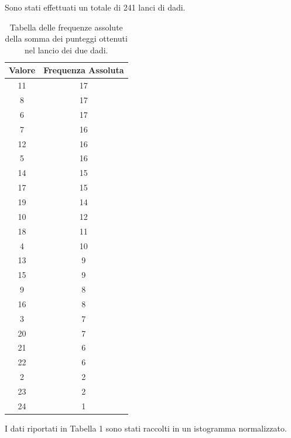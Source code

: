 Sono stati effettuati un totale di 241 lanci di dadi. 

\begin{table}[H]
	\centering
	\begin{tabular}{|c|c|}
		\hline
		\textbf{Valore} & \textbf{Frequenza Assoluta} \\
		\hline
		11 & 17 \\
		\hline
		8 & 17 \\
		\hline
		6 & 17 \\
		\hline
		7 & 16 \\
		\hline
		12 & 16 \\
		\hline
		5 & 16 \\
		\hline
		14 & 15 \\
		\hline
		17 & 15 \\
		\hline
		19 & 14 \\
		\hline
		10 & 12 \\
		\hline
		18 & 11 \\
		\hline
		4 & 10 \\
		\hline
		13 & 9 \\
		\hline
		15 & 9 \\
		\hline
		9 & 8 \\
		\hline
		16 & 8 \\
		\hline
		3 & 7 \\
		\hline
		20 & 7 \\
		\hline
		21 & 6 \\
		\hline
		22 & 6 \\
		\hline
		2 & 2 \\
		\hline
		23 & 2 \\
		\hline
		24 & 1 \\
		\hline
	\end{tabular}
	\caption{Tabella delle frequenze assolute della somma dei punteggi ottenuti nel lancio dei due dadi.}
	\label{tab:frequenze_assolute}
\end{table}


I dati riportati in Tabella 1 sono stati raccolti in un istogramma normalizzato.

